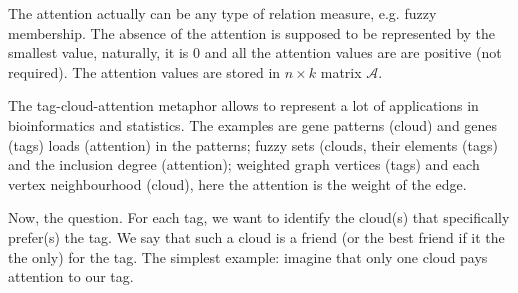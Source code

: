 \documentclass{llncs}
\begin{document}
The attention actually can be any type of relation measure, e.g. fuzzy membership. The absence of the attention is supposed to be represented by the smallest value, naturally, it is 0 and all the attention values are are positive (not required). The attention values are stored in $n\times k$ matrix $\mathcal{A}$.

The tag-cloud-attention metaphor allows to represent a lot of applications in bioinformatics and statistics. The examples are gene patterns (cloud) and genes (tags) loads (attention) in the patterns; fuzzy sets (clouds, their elements (tags) and the inclusion degree (attention); weighted graph vertices (tags) and each vertex neighbourhood (cloud), here the attention is the weight of the edge. 

Now, the question. For each tag, we want to identify the cloud(s) that specifically prefer(s) the tag. We say that such a cloud is a friend (or the best friend if it the the only) for the tag. The simplest example: imagine that only one cloud pays attention to our tag. 

\end{document}
